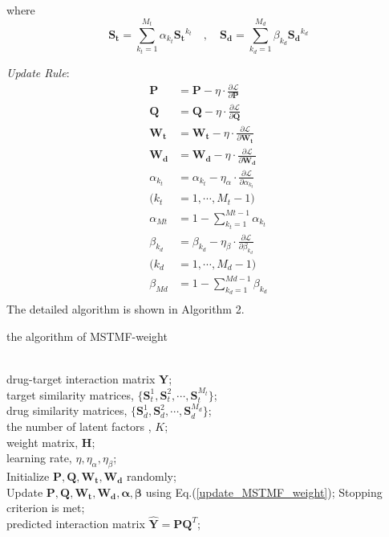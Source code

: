 \documentclass{article}
\begin{document}
where \[ \bm{S_t}=\sum_{k_t=1}^{M_t}\alpha_{k_t}\bm{S_t}^{k_t}\quad,\quad \bm{S_d}=\sum_{k_d=1}^{M_d}\beta_{k_d}\bm{S_d}^{k_d}  \]

\textit{Update Rule}:
\begin{equation} \label{update_MSTMF_weight} %
\begin{split}
\bm{P} &= \bm{P} - \eta\cdot\frac{\partial \mathcal{L}}{\partial \bm{P}}\\
\bm{Q} &= \bm{Q} - \eta\cdot\frac{\partial \mathcal{L}}{\partial \bm{Q}}\\
\bm{W_t} &= \bm{W_t} - \eta\cdot\frac{\partial \mathcal{L}}{\partial \bm{W_t}}\\
\bm{W_d} &= \bm{W_d} - \eta\cdot\frac{\partial \mathcal{L}}{\partial \bm{W_d}}\\
\alpha_{k_t} &= \alpha_{k_t} - \eta_\alpha \cdot\frac{\partial \mathcal{L}}{\partial \alpha_{k_t}}\\
 (k_t&=1,\cdots, M_t-1)\\
\alpha_{Mt} &= 1 - \sum_{k_t=1}^{Mt-1}\alpha_{k_t}\\
\beta_{k_d} &= \beta_{k_d} - \eta_\beta \cdot\frac{\partial \mathcal{L}}{\partial \beta_{k_d}}\\
 (k_d&=1,\cdots, M_d-1)\\
\beta_{Md} &= 1 - \sum_{k_d=1}^{Md-1}\beta_{k_d}\\
\end{split}
\end{equation}
The detailed algorithm is shown in Algorithm 2.\\
\renewcommand{\algorithmicrequire}{\textbf{Input:}}  %
\renewcommand{\algorithmicensure}{\textbf{Output:}}  %
\begin{algorithm}[htb] 
\caption{ the algorithm of MSTMF-weight } 
\label{alg:Framwork} 
\begin{algorithmic}[1] 
\REQUIRE ~~\\ %
drug-target interaction matrix $\bm{Y}$;\\
target similarity matrices, $\{\bm{S}_t^1,\bm{S}_t^2,\cdots,\bm{S}_t^{M_t}\}$; \\
drug similarity matrices, $\{\bm{S}_d^1,\bm{S}_d^2,\cdots,\bm{S}_d^{M_d}\}$; \\
the number of latent factors , $K$;\\
weight matrix, $\bm{H}$; \\
learning rate, $\eta, \eta_\alpha, {\eta}_{\beta}$;\\

\STATE Initialize $\bm{P},\bm{Q},\bm{W_t},\bm{W_d}$ randomly;\\
\REPEAT 
\STATE Update $\bm{P},\bm{Q},\bm{W_t},\bm{W_d},\bm{\alpha},\bm{\beta}$  using Eq.(\ref{update_MSTMF_weight}); 
\UNTIL Stopping criterion is met;
\ENSURE ~~\\ %
predicted interaction matrix $\bm{\hat{Y}}=\bm{P}\bm{Q}^T$; %
\end{algorithmic}
\end{algorithm}
\end{document}
